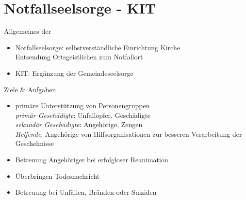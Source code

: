 \section{Notfallseelsorge - KIT}
\begin{sectionbox}{Allgemeines der }
    \begin{itemize}
        \item Notfallseelsorge: selbstverständliche Einrichtung Kirche\\
        \ra Entsendung Ortsgeistlichen zum Notfallort
        \item KIT: Ergänzung der Gemeindeseelsorge
    \end{itemize}
\end{sectionbox}
\begin{sectionbox}{Ziele \& Aufgaben}
    \begin{itemize}
        \item primäre Unterstützung von Personengruppen\\
        \ra \emph{primär Geschädigte}: Unfallopfer, Geschädigte\\
        \ra \emph{sekundär Geschädigte}: Angehörige, Zeugen\\
        \ra \emph{Helfende}: Angehörige von Hilfsorganisationen zur besseren Verarbeitung der Geschehnisse
        \item Betreuung Angehöriger bei erfolgloser Reanimation
        \item Überbringen Todesnachricht
        \item Betreuung bei Unfällen, Bränden oder Suiziden
    \end{itemize}
\end{sectionbox}